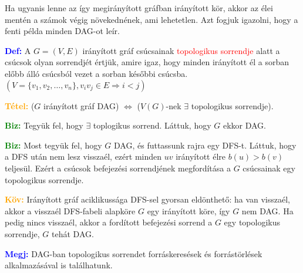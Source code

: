 \documentclass[../../szobeli.tex]{subfiles}
\begin{document}
\begin{itemize}
            Ha ugyanis lenne az így megirányított gráfban irányított kör, akkor az élei mentén a számok végig növekednének, ami lehetetlen. Azt fogjuk igazolni, hogy a fenti példa minden DAG-ot leír.

            \textcolor{blue}{\textbf{Def:}} A $G = (V,E)$ irányított gráf csúcsainak \textcolor{red}{topologikus sorrendje} alatt a csúcsok olyan sorrendjét értjük, amire igaz, hogy minden irányított él a sorban előbb álló csúcsból vezet a sorban későbbi csúcsba. $(V=\{v_1,v_2,\dots,v_n\},v_iv_j \in E \Rightarrow i < j)$

            \textcolor{orange}{\textbf{Tétel:}} ($G$ irányított gráf DAG) $\Leftrightarrow$ ($V(G)$-nek $\exists$ topologikus sorrendje).

            \textcolor{green}{\textbf{Biz:}} Tegyük fel, hogy $\exists$ toplogikus sorrend. Láttuk, hogy $G$ ekkor DAG. \checkmark

            \textcolor{green}{\textbf{Biz:}} Most tegyük fel, hogy $G$ DAG, és futtassunk rajra egy DFS-t. Láttuk, hogy a DFS után nem lesz visszaél, ezért minden $uv$ irányított élre $b(u) > b(v)$ teljesül. Ezért a csúcsok befejezési sorrendjének megfordítása a $G$ csúcsainak egy topologikus sorrendje.   

            \textcolor{orange}{\textbf{Köv:}} Irányított gráf aciklikussága DFS-sel gyorsan eldönthető: ha van visszaél, akkor a visszaél DFS-fabeli alapköre $G$ egy irányított köre, így $G$ nem DAG. Ha pedig nincs visszaél, akkor a fordított befejezési sorrend a $G$ egy topologikus sorrendje, $G$ tehát DAG.

            \textcolor{blue}{\textbf{Megj:}} DAG-ban topologikus sorrendet forráskeresések és forrástörlések alkalmazásával is találhatunk.

    \end{itemize}
\end{document}
